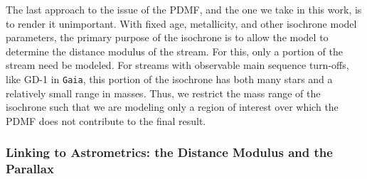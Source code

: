 \documentclass[twocolumn]{aastex631}
\newcommand{\stream}[1]{#1}
\newcommand{\dataarchive}[1]{\texttt{#1}}
\newcommand{\Gaia}{\dataarchive{Gaia}}
\begin{document}
            The last approach to the issue of the PDMF, and the one we take in
            this work, is to render it unimportant.  With fixed age,
            metallicity, and other isochrone model parameters, the primary
            purpose of the isochrone is to allow the model to determine the
            distance modulus of the stream. For this, only a portion of the
            stream need be modeled.  For streams with observable main sequence
            turn-offs, like \stream{GD-1} in \Gaia, this portion of the
            isochrone has both many stars and a relatively small range in
            masses. Thus, we restrict the mass range of the isochrone such that
            we are modeling only a region of interest over which the PDMF does
            not contribute to the final result.


        \subsubsection{Linking to Astrometrics: the Distance Modulus and the Parallax} \label{ssub:method:linking_to_astrometrics}
\end{document}
